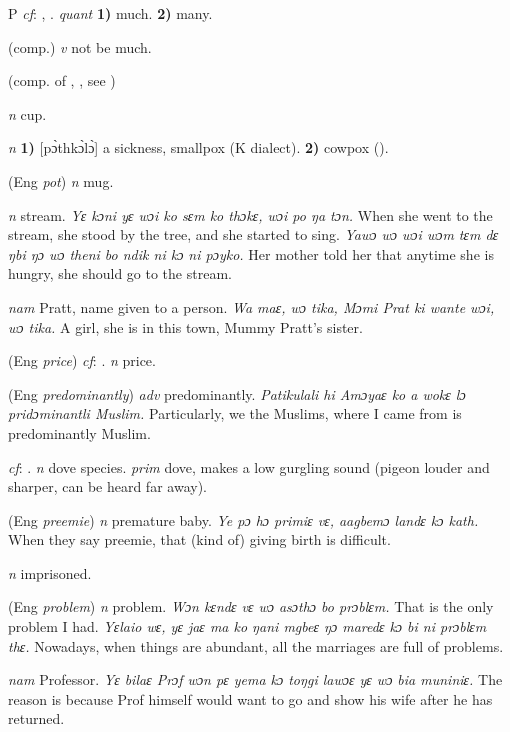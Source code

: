 \begin{letter}{P}
 \textit{cf}: , . \textit{quant} \textbf{1)} much. \textbf{2)} many.

 (comp.) \textit{v} not be much.

 (comp. of , , see ) 

 \textit{n} cup.

 \textit{n} \textbf{1)} [pɔ̀thkɔ̀lɔ̀] a sickness, smallpox (K dialect). \textbf{2)} cowpox (\citealt{Pichl1967}). 

 (Eng \textit{pot}) \textit{n} mug.

 \textit{n} stream. \textit{Yɛ kɔni yɛ wɔi ko sɛm ko thɔkɛ, wɔi po ŋa tɔn.} When she went to the stream, she stood by the tree, and she started to sing. \textit{Yawɔ wɔ wɔi wɔm tɛm dɛ ŋbi ŋɔ wɔ theni bo ndik ni kɔ ni pɔyko.} Her mother told her that anytime she is hungry, she should go to the stream.

 \textit{nam} Pratt, name given to a person. \textit{Wa maɛ, wɔ tika, Mɔmi Prat ki wante wɔi, wɔ tika.} A girl, she is in this town, Mummy Pratt's sister.

 (Eng \textit{price}) \textit{cf}: . \textit{n} price.

 (Eng \textit{predominantly}) \textit{adv} predominantly. \textit{Patikulali hi Amɔyaɛ ko a wokɛ lɔ pridɔminantli Muslim.} Particularly, we the Muslims, where I came from is predominantly Muslim.

 \textit{cf}: . \textit{n} dove species. \textit{prim} dove, makes a low gurgling sound (pigeon louder and sharper, can be heard far away). 

 (Eng \textit{preemie}) \textit{n} premature baby. \textit{Ye pɔ hɔ primiɛ vɛ, aagbemɔ landɛ kɔ kath.} When they say preemie, that (kind of) giving birth is difficult.

 \textit{n} imprisoned.

 (Eng \textit{problem}) \textit{n} problem. \textit{Wɔn kɛndɛ vɛ wɔ asɔthɔ bo prɔblɛm.} That is the only problem I had. \textit{Yɛlaio wɛ, yɛ jaɛ ma ko ŋani mgbeɛ ŋɔ maredɛ kɔ bi ni prɔblɛm thɛ.} Nowadays, when things are abundant, all the marriages are full of problems.

 \textit{nam} Professor. \textit{Yɛ bilaɛ Prɔf wɔn pɛ yema kɔ toŋgi lawɔɛ yɛ wɔ bia muniniɛ.} The reason is because Prof himself would want to go and show his wife after he has returned.


\end{letter}
